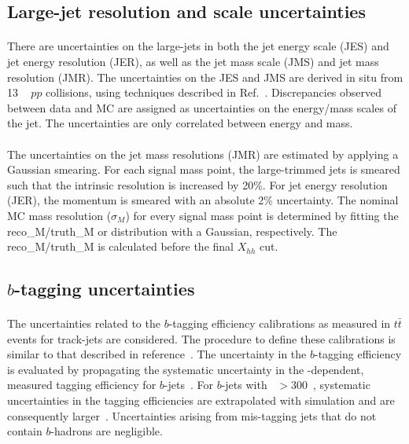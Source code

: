 \subsection{Large-\R jet resolution and scale uncertainties} 
\paragraph{}
There are uncertainties on the large-\R jets in both the jet energy scale (JES) and jet energy resolution (JER), as well as the jet mass scale (JMS) and jet mass resolution (JMR).
The uncertainties on the JES and JMS are derived in situ from 13 \TeV~ $pp$ collisions, using techniques described in Ref.~\cite{JetMassAndSubstructure}. 
Discrepancies observed between data and MC are assigned as uncertainties on the energy/mass scales of the jet.
The uncertainties are only correlated between energy and mass.

\paragraph{}
The uncertainties on the jet mass resolutions (JMR) are estimated by applying a Gaussian smearing.
For each signal mass point, the large-\R trimmed jets is smeared such that the intrinsic resolution is increased by 20\%. 
For jet energy resolution (JER), the momentum is smeared with an absolute 2\% uncertainty. 
The nominal MC mass resolution ($\sigma_{M}$) for every signal mass point is determined by fitting the reco\_M/truth\_M or distribution with a Gaussian, respectively. 
The reco\_M/truth\_M is calculated before the final $X_{hh}$ cut.


\subsection{$b$-tagging uncertainties}
\label{sec:b-tagging-unc}

\paragraph{}
The uncertainties related to the $b$-tagging efficiency calibrations as measured in $t\bar{t}$ events for track-jets are considered. 
The procedure to define these calibrations is similar to that described in reference~\cite{Aad:2015ydr}. 
The uncertainty in the $b$-tagging efficiency is evaluated by propagating the systematic uncertainty in the \pt-dependent, measured tagging efficiency for $b$-jets~\cite{ATLAS-CONF-2014-004}. 
For $b$-jets with \pt~$> 300$~\GeV, systematic uncertainties in the tagging efficiencies are extrapolated with simulation and are consequently larger~\cite{Aad:2015ydr}. 
Uncertainties arising from mis-tagging jets that do not contain $b$-hadrons are negligible.

